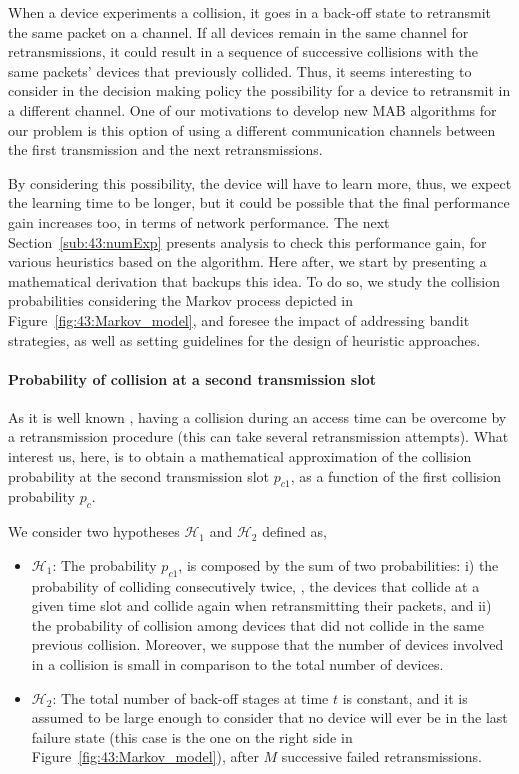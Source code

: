 When a device experiments a collision, it goes in a back-off state to retransmit the same packet on a channel.
If all devices remain in the same channel for retransmissions, it could result in a sequence of successive collisions with the same packets' devices that previously collided.
%
Thus, it seems interesting to consider in the decision making policy the possibility for a device to retransmit in a different channel.
One of our motivations to develop new MAB algorithms for our problem is this option of using a different communication channels between the first transmission and the next retransmissions.

By considering this possibility, the device will have to learn more, thus, we expect the learning time to be longer, but it could be possible that the final performance gain increases too, in terms of network performance.
The next Section~\ref{sub:43:numExp} presents analysis to check this performance gain, for various heuristics based on the \UCB{} algorithm.
%
Here after, we start by presenting a mathematical derivation that backups this idea.
To do so, we study the collision probabilities considering the Markov process depicted in Figure~\ref{fig:43:Markov_model}, and foresee the impact of addressing bandit strategies, as well as setting guidelines for the design of heuristic approaches.


\paragraph{Probability of collision at a second transmission slot}

As it is well known \cite{Abramson1970,Roberts75}, having a collision during an access time can be overcome by a retransmission procedure (this can take several retransmission attempts).
What interest us, here, is to obtain a mathematical approximation of the collision probability at the second transmission slot $p_{c1}$, as a function of the first collision probability $p_{c}$.

We consider two hypotheses $\mathcal{H}_{1}$ and $\mathcal{H}_{2}$ defined as,
\begin{itemize}
	\item $\mathcal{H}_{1}$:
    The probability $p_{c1}$, is composed by the sum of two probabilities: i)
    the probability of colliding consecutively twice, \ie, the devices that collide at a given time slot and collide again when retransmitting their packets,
    and ii) the probability of collision among devices that did not collide in the same previous collision. Moreover, we suppose that the number of devices involved in a collision is small in comparison to the total number of devices.
	\item $\mathcal{H}_{2}$:
	The total number of back-off stages at time $t$ is constant, and it is assumed to be large enough to consider that no device will ever be in the last failure state (this case is the one on the right side in Figure~\ref{fig:43:Markov_model}), after $M$ successive failed retransmissions.
\end{itemize}

